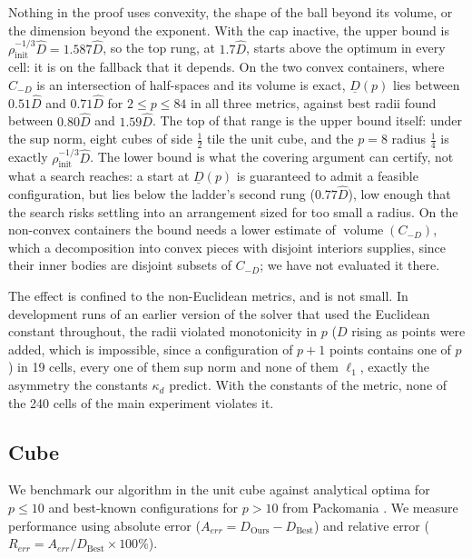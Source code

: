 \documentclass[preprint,12pt]{elsarticle}
\theoremstyle{remark}
\begin{document}
Nothing in the proof uses convexity, the shape of the ball beyond its volume, or
the dimension beyond the exponent. With the cap inactive, the upper bound is
$\rho_{\text{init}}^{-1/3} \hat D = 1.587 \hat D$, so the top rung, at $1.7 \hat
D$, starts above the optimum in every cell: it is on the fallback that it
depends. On the two convex containers, where $C_{-D}$ is an intersection of
half-spaces and its volume is exact, $\underline{D}(p)$ lies between $0.51 \hat
D$ and $0.71 \hat D$ for $2 \le p \le 84$ in all three metrics, against best
radii found between $0.80 \hat D$ and $1.59 \hat D$. The top of that range is
the upper bound itself: under the sup norm, eight cubes of side $\tfrac12$ tile
the unit cube, and the $p = 8$ radius $\tfrac14$ is exactly
$\rho_{\text{init}}^{-1/3} \hat D$. The lower bound is what the covering
argument can certify, not what a search reaches: a start at $\underline{D}(p)$
is guaranteed to admit a feasible configuration, but lies below the ladder's
second rung ($0.77 \hat D$), low enough that the search risks settling into an
arrangement sized for too small a radius. On the non-convex containers the bound
needs a lower estimate of $\operatorname{volume}(C_{-D})$, which a decomposition
into convex pieces with disjoint interiors supplies, since their inner bodies
are disjoint subsets of $C_{-D}$; we have not evaluated it there.

The effect is confined to the non-Euclidean metrics, and is not small. In
development runs of an earlier version of the solver that used the Euclidean
constant throughout, the radii violated monotonicity in $p$ ($D$ rising as
  points were added, which is impossible, since a configuration of $p + 1$
points contains one of $p$) in 19 cells, every one of them sup norm and none of
them $\ell_1$, exactly the asymmetry the constants $\kappa_d$ predict. With the
constants of the metric, none of the 240 cells of the main experiment violates
it.

\subsection{Cube}\label{sec:cube}

We benchmark our algorithm in the unit cube against analytical optima for $p \le
10$ \citep{schaer1966, schaer1994} and best-known configurations for $p > 10$
from Packomania \citep{packomania}. We measure performance using absolute error
($A_{err} = D_{\mathrm{Ours}} - D_{\mathrm{Best}}$) and relative error ($R_{err}
= A_{err}/D_{\mathrm{Best}} \times 100\%$).
\end{document}

